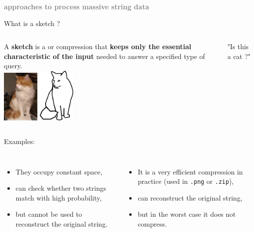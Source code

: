 \documentclass[aspectratio=169]{beamer}
\begin{document}
\begin{frame}
    \vfill
    \bigskip
    \begin{center}
        \textbf{\textcolor{gray}{ approaches to process massive string data}}
    \end{center}
    \vfill
\end{frame}

\begin{frame}{What is a sketch ?}
    \begin{columns}
        A \textbf{sketch} is a  or  compression that \textbf{keeps only the essential characteristic of the input} needed to answer a specified type of query.\\
        \includegraphics[width=1.8cm]{pictures/photo_betisou.jpg}
        \hspace{0.5cm}
        \includegraphics[width=1.8cm]{pictures/betisou.png}\\
        \begin{center}
            "Is this a cat ?"
        \end{center}
    \end{columns}
    \pause

    {\LARGE Examples:}
    \medskip
    \pause 
    \begin{columns}
        {}
        \begin{itemize}
            \item They occupy constant space,  
            \item can check whether two strings match with high probability,
            \item but cannot be used to reconstruct the original string. 
        \end{itemize}
        \pause
        {}
        \begin{itemize}
            \item It is a very efficient compression in practice (used in \texttt{.png} or \texttt{.zip}),
            \item can reconstruct the original string,
            \item but in the worst case it does not compress. 
        \end{itemize}
    \end{columns}
    

\end{frame}
\end{document}
